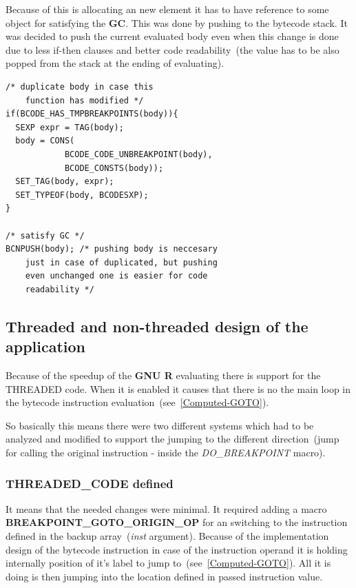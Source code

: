 \documentclass[thesis=M,english]{FITthesis}[2018/10/20]
\begin{document}
Because of this is allocating an new element it has to have reference to some object for satisfying the \textbf{GC}. This was done by pushing to the bytecode stack. It was decided to push the current evaluated body even when this change is done due to less if-then clauses and better code readability~(the value has to be also popped from the stack at the ending of evaluating).

\begin{lstlisting}
/* duplicate body in case this 
	function has modified */
if(BCODE_HAS_TMPBREAKPOINTS(body)){
  SEXP expr = TAG(body);
  body = CONS(
            BCODE_CODE_UNBREAKPOINT(body), 
            BCODE_CONSTS(body));
  SET_TAG(body, expr);
  SET_TYPEOF(body, BCODESXP);
}

/* satisfy GC */
BCNPUSH(body); /* pushing body is neccesary 
	just in case of duplicated, but pushing 
	even unchanged one is easier for code
    readability */

\end{lstlisting}

\subsection{Threaded and non-threaded design of the application}\label{threaded-and-non-threaded-design}

Because of the speedup of the \textbf{GNU R} evaluating there is support for the THREADED code. When it is enabled it causes that there is no the main loop in the bytecode instruction evaluation~(see~\ref{Computed-GOTO}). 

So basically this means there were two different systems which had to be analyzed and modified to support the jumping to the different direction~(jump for calling the original instruction - inside the \textit{DO{\_}BREAKPOINT} macro).

\subsubsection{THREADED{\_}CODE defined}
It means that the needed changes were minimal. It required adding a macro \textbf{BREAKPOINT{\_}GOTO{\_}ORIGIN{\_}OP} for an switching to the instruction defined in the backup array~(\textit{inst} argument). Because of the implementation design of the bytecode instruction in case of the instruction operand it is holding internally position of it's label to jump to~(see~\ref{Computed-GOTO}). All it is doing is then jumping into the location defined in passed instruction value.
\end{document}

